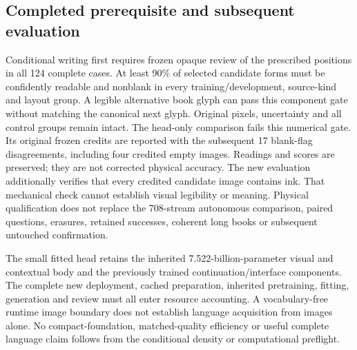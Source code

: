 \subsection*{Completed prerequisite and subsequent evaluation}
Conditional writing first requires frozen opaque review of the prescribed
positions in all 124 complete cases. At least 90\% of selected candidate forms
must be confidently readable and nonblank in every training/development,
source-kind and layout group. A legible alternative book glyph can pass this
component gate without matching the canonical next glyph. Original pixels,
uncertainty and all control groups remain intact. The head-only comparison
fails this numerical gate. Its original frozen credits are reported with the
subsequent 17 blank-flag disagreements, including four credited empty images.
Readings and scores are preserved; they are not corrected physical accuracy.
The new evaluation additionally verifies that every credited candidate image
contains ink. That mechanical check cannot establish visual legibility or
meaning. Physical qualification does not replace the 708-stream autonomous
comparison, paired questions, erasures,
retained successes, coherent long books or subsequent untouched confirmation.

The small fitted head retains the inherited 7.522-billion-parameter visual and
contextual body and the previously trained continuation/interface components.
The complete new deployment, cached preparation, inherited pretraining, fitting,
generation and review must all enter resource accounting. A vocabulary-free
runtime image boundary does not establish language acquisition from images
alone. No compact-foundation, matched-quality efficiency or useful complete
language claim follows from the conditional density or computational preflight.

